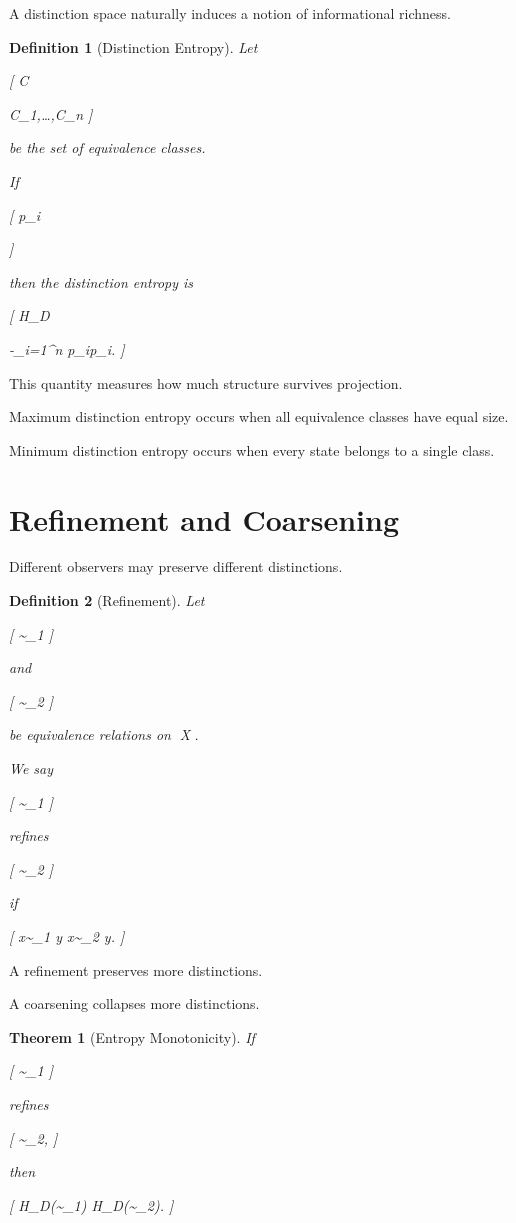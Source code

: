 \documentclass[11pt,oneside,openany]{book}
\newtheorem{definition}{Definition}[chapter] \newtheorem{theorem}{Theorem}[chapter] \newtheorem{proposition}{Proposition}[chapter] \newtheorem{lemma}{Lemma}[chapter] \newtheorem{corollary}{Corollary}[chapter] \newtheorem{remark}{Remark}[chapter]
\begin{document}
A distinction space naturally induces a notion of informational richness.

\begin{definition}[Distinction Entropy]

Let

[
\mathcal C

{C_1,\ldots,C_n}
]

be the set of equivalence classes.

If

[
p_i

]

then the distinction entropy is

[
H_D

-\sum_{i=1}^{n}
p_i\log p_i.
]

\end{definition}

This quantity measures how much structure survives projection.

Maximum distinction entropy occurs when all equivalence classes have equal size.

Minimum distinction entropy occurs when every state belongs to a single class.

\section{Refinement and Coarsening}

Different observers may preserve different distinctions.

\begin{definition}[Refinement]

Let

[
\sim_1
]

and

[
\sim_2
]

be equivalence relations on X.

We say

[
\sim_1
]

refines

[
\sim_2
]

if

[
x\sim_1 y
\Rightarrow
x\sim_2 y.
]

\end{definition}

A refinement preserves more distinctions.

A coarsening collapses more distinctions.

\begin{theorem}[Entropy Monotonicity]

If

[
\sim_1
]

refines

[
\sim_2,
]

then

[
H_D(\sim_1)
\ge
H_D(\sim_2).
]

\end{theorem}
\end{document}
